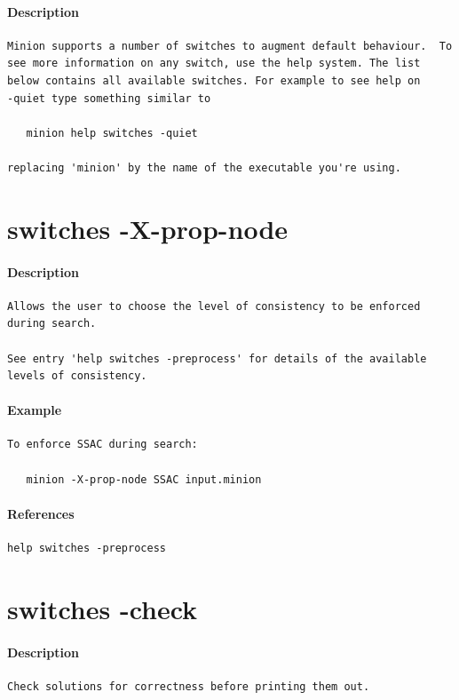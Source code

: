 \documentclass[oneside]{book}
\begin{document}
\paragraph{Description}
{\footnotesize
\begin{verbatim}
Minion supports a number of switches to augment default behaviour.  To
see more information on any switch, use the help system. The list
below contains all available switches. For example to see help on
-quiet type something similar to

   minion help switches -quiet

replacing 'minion' by the name of the executable you're using.
\end{verbatim}
}
\section{switches -X-prop-node}
\paragraph{Description}
{\footnotesize
\begin{verbatim}
Allows the user to choose the level of consistency to be enforced
during search.

See entry 'help switches -preprocess' for details of the available
levels of consistency.
\end{verbatim}
}
\paragraph{Example}
{\footnotesize
\begin{verbatim}
To enforce SSAC during search:

   minion -X-prop-node SSAC input.minion
\end{verbatim}
}
\paragraph{References}
{\footnotesize
\begin{verbatim}
help switches -preprocess
\end{verbatim}
}
\section{switches -check}
\paragraph{Description}
{\footnotesize
\begin{verbatim}
Check solutions for correctness before printing them out.
\end{verbatim}
}
\end{document}
